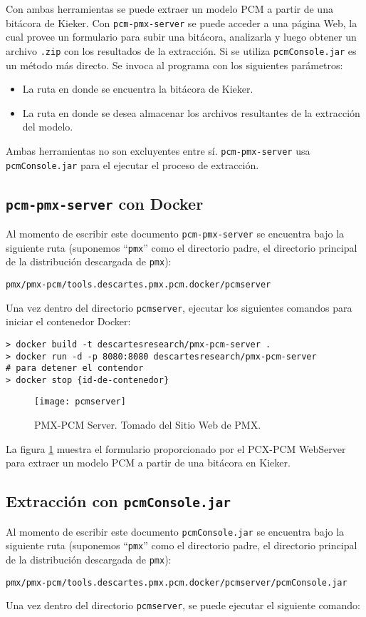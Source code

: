 Con ambas herramientas se puede extraer un modelo PCM a partir de una bitácora de Kieker. Con \texttt{pcm-pmx-server} se puede acceder a una página Web, la cual provee un formulario para subir una bitácora, analizarla y luego obtener un archivo \texttt{.zip} con los resultados de la extracción. Si se utiliza \texttt{pcmConsole.jar} es un método más directo. Se invoca al programa con los siguientes parámetros:
\begin{itemize}
    \item La ruta en donde se encuentra la bitácora de Kieker.
    \item La ruta en donde se desea almacenar los archivos resultantes de la extracción del modelo.
\end{itemize}
Ambas herramientas no son excluyentes entre sí.  \texttt{pcm-pmx-server} usa \texttt{pcmConsole.jar} para el ejecutar el proceso de extracción.

\subsection{\texttt{pcm-pmx-server} con Docker} 
Al momento de escribir este documento \texttt{pcm-pmx-server} se encuentra bajo la siguiente ruta (suponemos ``\texttt{pmx}'' como el directorio padre, el directorio principal de la distribución descargada de \texttt{pmx}):
\begin{verbatim}
pmx/pmx-pcm/tools.descartes.pmx.pcm.docker/pcmserver
\end{verbatim}
Una vez dentro del directorio \texttt{pcmserver}, ejecutar los siguientes comandos para iniciar el contenedor Docker:

\begin{verbatim}
> docker build -t descartesresearch/pmx-pcm-server .
> docker run -d -p 8080:8080 descartesresearch/pmx-pcm-server
# para detener el contendor
> docker stop {id-de-contenedor}
\end{verbatim}

\begin{figure}[h]
  \centering
  \texttt{[image: pcmserver]}
  \caption{PMX-PCM Server. Tomado del Sitio Web de PMX.}
  \label{fig:pcmserver}
\end{figure}

La figura \ref{fig:pcmserver} muestra el formulario proporcionado por el PCX-PCM WebServer para extraer un modelo PCM a partir de una bitácora en Kieker.

\subsection{Extracción con \texttt{pcmConsole.jar}} Al momento de escribir este documento \texttt{pcmConsole.jar} se encuentra bajo la siguiente ruta (suponemos ``\texttt{pmx}'' como el directorio padre, el directorio principal de la distribución descargada de \texttt{pmx}):
\begin{verbatim}
pmx/pmx-pcm/tools.descartes.pmx.pcm.docker/pcmserver/pcmConsole.jar
\end{verbatim}
Una vez dentro del directorio \texttt{pcmserver}, se puede ejecutar el siguiente comando:

